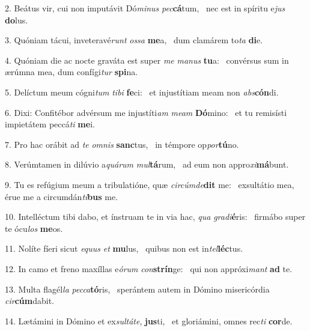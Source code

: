 2. Beátus vir, cui non imputávit Dó\textit{mi}\textit{nus} \textit{pec}\textbf{cá}tum, \ast\  nec est in spíritu e\textit{jus} \textbf{do}lus.\

3. Quóniam tácui, inveteravé\textit{runt} \textit{os}\textit{sa} \textbf{me}a, \ast\  dum clamárem to\textit{ta} \textbf{di}e.\

4. Quóniam die ac nocte graváta est super \textit{me} \textit{ma}\textit{nus} \textbf{tu}a: \ast\  convérsus sum in ærúmna mea, dum confígi\textit{tur} \textbf{spi}na.\

5. Delíctum meum cógni\textit{tum} \textit{ti}\textit{bi} \textbf{fe}ci: \ast\  et injustítiam meam non \textit{abs}\textbf{cón}di.\

6. Dixi: Confitébor advérsum me injustíti\textit{am} \textit{me}\textit{am} \textbf{Dó}mino: \ast\  et tu remisísti impietátem peccá\textit{ti} \textbf{me}i.\

7. Pro hac orábit ad \textit{te} \textit{om}\textit{nis} \textbf{sanc}tus, \ast\  in témpore op\textit{por}\textbf{tú}no.\

8. Verúmtamen in dilúvio a\textit{quá}\textit{rum} \textit{mul}\textbf{tá}rum, \ast\  ad eum non appro\textit{xi}\textbf{má}bunt.\

9. Tu es refúgium meum a tribulatióne, quæ \textit{cir}\textit{cúm}\textit{de}\textbf{dit} me: \ast\  exsultátio mea, érue me a circumdán\textit{ti}\textbf{bus} me.\

10. Intelléctum tibi dabo, et ínstruam te in via hac, \textit{qua} \textit{gra}\textit{di}\textbf{é}ris: \ast\  firmábo super te ócu\textit{los} \textbf{me}os.\

11. Nolíte fíeri sicut \textit{e}\textit{quus} \textit{et} \textbf{mu}lus, \ast\  quibus non est in\textit{tel}\textbf{léc}tus.\

12. In camo et freno maxíllas e\textit{ó}\textit{rum} \textit{con}\textbf{strín}ge: \ast\  qui non appróxi\textit{mant} \textbf{ad} te.\

13. Multa flagél\textit{la} \textit{pec}\textit{ca}\textbf{tó}ris, \ast\  sperántem autem in Dómino misericórdia \textit{cir}\textbf{cúm}dabit.\

14. Lætámini in Dómino et ex\textit{sul}\textit{tá}\textit{te}, \textbf{jus}ti, \ast\  et gloriámini, omnes rec\textit{ti} \textbf{cor}de.\

